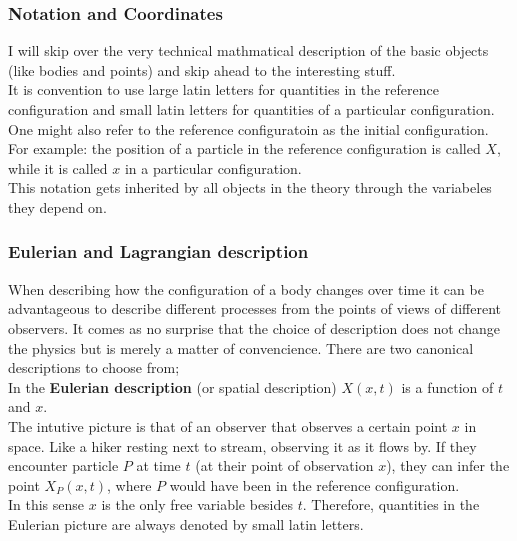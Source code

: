 \documentclass[../../main.tex]{subfiles}
\begin{document}
\subsubsection{Notation and Coordinates} 

I will skip over the very technical mathmatical description of the basic objects (like bodies and points) and skip ahead to the interesting stuff. \\

It is convention to use large latin letters for quantities in the reference configuration and small latin letters for quantities of a particular configuration. One might also refer to the reference configuratoin as the initial configuration.\\

For example: the position of a particle in the reference configuration is called $X$, while it is called $x$ in a particular configuration. \\

This notation gets inherited by all objects in the theory through the variabeles they depend on.

\subsubsection{Eulerian and Lagrangian description}

When describing how the configuration of a body changes over time it can be advantageous to describe different processes from the points of views of different observers. It comes as no surprise that the choice of description does not change the physics but is merely a matter of convencience. There are two canonical descriptions to choose from; \\

In the \textbf{Eulerian description} (or spatial description) $X(x, t)$ is a function of $t$ and $x$. \\

The intutive picture is that of an observer that observes a certain point $x$ in space. Like a hiker resting next to stream, observing it as it flows by. If they encounter particle $P$ at time $t$ (at their point of observation $x$), they can infer the point $X_P(x,t)$, where $P$ would have been in the reference configuration. \\

In this sense $x$ is the only free variable besides $t$. Therefore, quantities in the Eulerian picture are always denoted by small latin letters. \\
\end{document}
